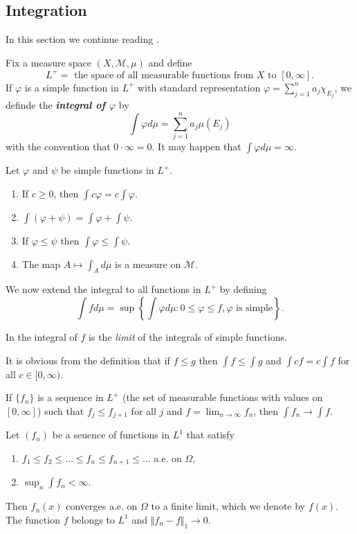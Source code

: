 \documentclass{article}
\theoremstyle{definition}
\numberwithin{equation}{section}
\begin{document}
	\subsection{Integration}
		In this section we continue reading \cite{folland}.
		
		Fix a measure space $(X,\mathcal{M},\mu)$ and define
		\[L^+=\text{ the space of all measurable functions from }X\text{ to }[0,\infty].\]
		If $\varphi$ is a simple function in $L^+$ with standard representation $\varphi=\sum_{j=1}^na_j\chi_{E_j}$, we definde the \textbf{\textit{integral of $\varphi$}} by
		\[\int\varphi d\mu=\sum_{j=1}^n a_j\mu(E_j)\]
		with the convention that $0\cdot\infty=0$. It may happen that $\int\varphi d\mu=\infty$.
		
		\begin{prop}Let $\varphi$ and $\psi$ be simple functions in $L^+$.
			\begin{enumerate}
				\item If $c\geq0$, then $\int c\varphi=c\int\varphi$.
				\item $\int(\varphi+\psi)=\int\varphi+\int\psi$.
				\item If $\varphi\leq\psi$ then $\int\varphi\leq\int\psi$.
				\item The map $A\mapsto\int_Ad\mu$ is a measure on $\mathcal{M}$.
			\end{enumerate}
		\end{prop}
		We now extend the integral to all functions in $L^+$ by defining
		\[\int fd\mu=\sup\left\{\int\varphi d\mu:0\leq\varphi\leq f,\varphi\text{ is simple}\right\}.\]
		\begin{remark}
			In \cite{riesz} the integral of $f$ is the \textit{limit} of the integrals of simple functions.
		\end{remark}
		\begin{remark}
			It is obvious from the definition that if $f\leq g$ then $\int f\leq\int g$ and $\int cf=c\int f$ for all $c\in[0,\infty)$.
		\end{remark}
		\begin{thm}
			If $\{f_n\}$ is a sequence in $L^+$ (the set of measurable functions with values on $[0,\infty]$) such that $f_j\leq f_{j+1}$ for all $j$ and $f=\lim_{n\to\infty}f_n$, then $\int f_n\to\int f$.
		\end{thm}
		\begin{thm}
			Let $(f_n)$ be a seuence of functions in $L^1$ that satisfy
			\begin{enumerate}
				\item $f_1\leq f_2\leq\ldots\leq f_n\leq f_{n+1}\leq\ldots$ a.e. on $\Omega$,
				\item $\sup_n\int f_n<\infty$.
			\end{enumerate}
			Then $f_n(x)$ converges a.e. on $\Omega$ to a finite limit, which we denote by $f(x)$. The function $f$ belongs to $L^1$ and $\Vert f_n-f\Vert_1\to0$.
		\end{thm}
\end{document}
